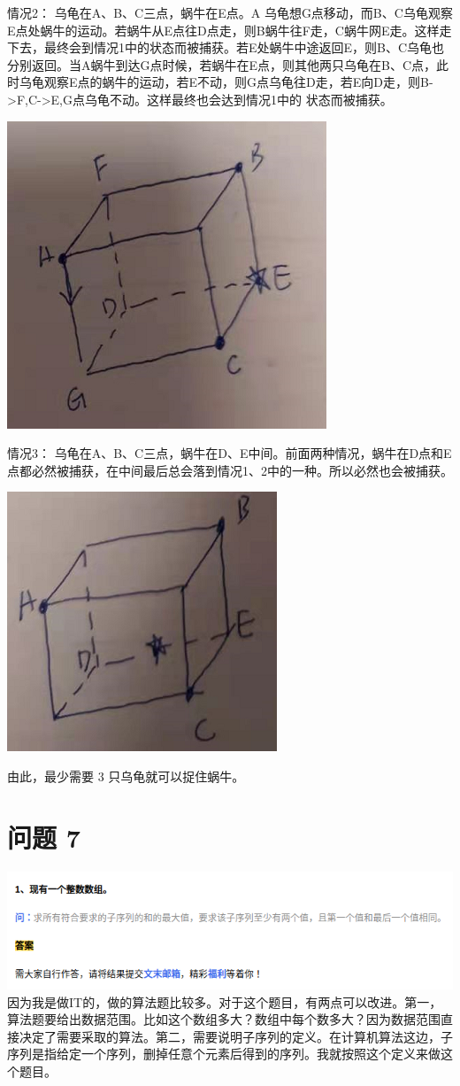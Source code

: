 \documentclass{article}
\begin{document}
\vspace{60pt}

情况2： 乌龟在A、B、C三点，蜗牛在E点。A 乌龟想G点移动，而B、C乌龟观察E点处蜗牛的运动。若蜗牛从E点往D点走，则B蜗牛往F走，C蜗牛网E走。这样走下去，最终会到情况1中的状态而被捕获。若E处蜗牛中途返回E，则B、C乌龟也分别返回。当A蜗牛到达G点时候，若蜗牛在E点，则其他两只乌龟在B、C点，此时乌龟观察E点的蜗牛的运动，若E不动，则G点乌龟往D走，若E向D走，则B->F,C->E,G点乌龟不动。这样最终也会达到情况1中的 状态而被捕获。

\includegraphics[scale=0.5]{cube03.png}

\vspace{60pt}

情况3： 乌龟在A、B、C三点，蜗牛在D、E中间。前面两种情况，蜗牛在D点和E点都必然被捕获，在中间最后总会落到情况1、2中的一种。所以必然也会被捕获。

\includegraphics[scale=0.5]{cube04.png}

由此，最少需要 3 只乌龟就可以捉住蜗牛。



\newpage
\section{问题 7}
\includegraphics[scale=0.7]{algo.png}
因为我是做IT的，做的算法题比较多。对于这个题目，有两点可以改进。第一，算法题要给出数据范围。比如这个数组多大？数组中每个数多大？因为数据范围直接决定了需要采取的算法。第二，需要说明子序列的定义。在计算机算法这边，子序列是指给定一个序列，删掉任意个元素后得到的序列。我就按照这个定义来做这个题目。
\end{document}
